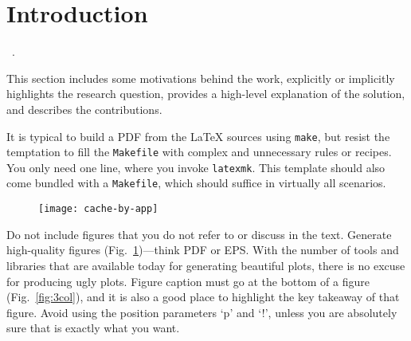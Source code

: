\section{Introduction}\label{s:intro}

~\cite{Heiser-WebArticle2022}.


This section includes some motivations behind the work, explicitly or implicitly
highlights the research question, provides a high-level explanation of the
solution, and describes the contributions.

\textcolor{lightgray}{\lipsum[1]}

%
It is typical to build a PDF from the \LaTeX{} sources using \texttt{make}, but
resist the temptation to fill the \texttt{Makefile} with complex and unnecessary
rules or recipes.
%
You only need one line, where you invoke \texttt{latexmk}.
%
This template should also come bundled with a \texttt{Makefile}, which should
suffice in virtually all scenarios.

\textcolor{lightgray}{\lipsum[3-4]}

\begin{figure}[tbh]
    \texttt{[image: cache-by-app]}
    \label{fig:1col}
\end{figure}

%
Do not include figures that you do not refer to or discuss in the text.
%
Generate high-quality figures (Fig.~\ref{fig:1col})---think PDF or EPS.
%
With the number of tools and libraries that are available today for generating
beautiful plots, there is no excuse for producing ugly plots.
%
Figure caption must go at the bottom of a figure (Fig.~\ref{fig:3col}), and it
is also a good place to highlight the key takeaway of that figure.
%
Avoid using the position parameters `p' and `!', unless you are absolutely sure
that is exactly what you want.

